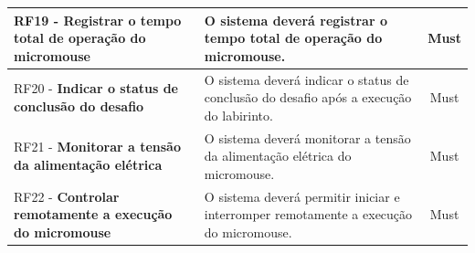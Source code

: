 \begin{center}
\begin{longtable}{|p{5.5cm}|p{8cm}|c|}
    RF19 - \textbf{Registrar o tempo total de operação do micromouse} & O sistema deverá registrar o tempo total de operação do micromouse. & Must \\ \hline

    RF20 - \textbf{Indicar o status de conclusão do desafio} & O sistema deverá indicar o status de conclusão do desafio após a execução do labirinto. & Must \\ \hline

    RF21 - \textbf{Monitorar a tensão da alimentação elétrica} & O sistema deverá monitorar a tensão da alimentação elétrica do micromouse. & Must \\ \hline

    RF22 - \textbf{Controlar remotamente a execução do micromouse} & O sistema deverá permitir iniciar e interromper remotamente a execução do micromouse. & Must \\ \hline

    \end{longtable}
    \end{center}

